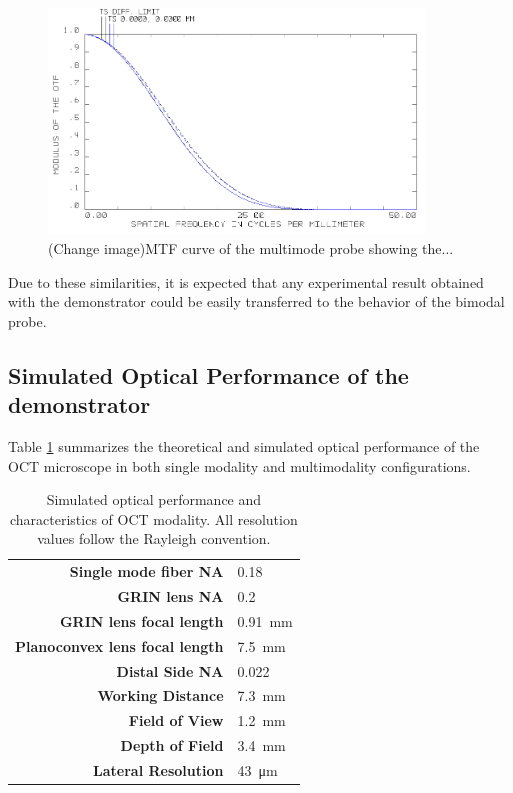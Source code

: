 \begin{figure}[h!]\centering
      \includegraphics[width=10cm]{figures/30_DesignSimulation/Optical/beamsplitterMTF.png}
      \caption{(Change image)MTF curve of the multimode probe showing the...}
      \label{fig:singleMTF}
\end{figure}

Due to these similarities, it is expected that any experimental result obtained with the demonstrator could be easily transferred to the behavior of the bimodal probe.

\subsection{Simulated Optical Performance of the demonstrator}

Table \ref{tab:simRes} summarizes the theoretical and simulated optical performance of the OCT microscope in both single modality and multimodality configurations.

\begin{table}[h!]\centering
	\begin{tabular}{rl}\\
		\hline
     	\textbf{Single mode fiber NA} & 0.18 \\ 
		\textbf{GRIN lens NA} & 0.2 \\ 
		\textbf{GRIN lens focal length} & \SI{0.91}{\milli\meter} \\ 
		\textbf{Planoconvex lens focal length} & \SI{7.5}{\milli\meter} \\ 
		\textbf{Distal Side NA} & 0.022 \\ 
		\textbf{Working Distance} & \SI{7.3}{\milli\meter} \\ 
		\textbf{Field of View} & \SI{1.2}{\milli\meter} \\ 
		\textbf{Depth of Field} & \SI{3.4}{\milli\meter} \\ 
		\textbf{Lateral Resolution} & \SI{43}{\micro\meter} \\ 
		\hline
	\end{tabular} 
    \caption{Simulated optical performance and characteristics of OCT modality. All resolution values follow the Rayleigh convention.}
    \label{tab:simRes}
\end{table}


